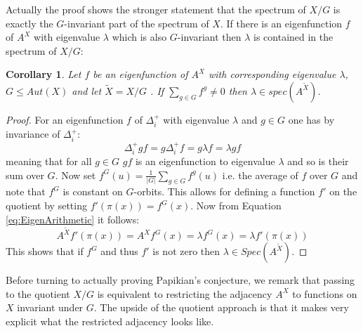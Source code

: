 \documentclass[11pt]{amsart}
\newtheorem{corollary}[theorem]{Corollary}
\begin{document}
	Actually the proof shows the stronger statement that the spectrum of $X/G$ is exactly the $G$-invariant part of the spectrum of $X$. If there is an eigenfunction $f$ of $A^X$ with eigenvalue $\lambda$ which is also $G$-invariant then $\lambda$ is contained in the spectrum of $X/G$:
	\begin{corollary}
		Let $f$ be an eigenfunction of $A^X$ with corresponding eigenvalue $\lambda$, $G\leq Aut(X)$ and let $\tilde{X}=X/G$ . If $\sum_{g\in G} f^g\neq 0$ then $\lambda\in spec(A^{\tilde{X}})$.
		\label{cor:PreciseSpectrum}
	\end{corollary}
	\begin{proof}
		For an eigenfunction $f$ of $\Delta_i^+$  with eigenvalue $\lambda$ and $g\in G$ one has by invariance of $\Delta_i^+$:
        \begin{equation}
            \Delta_i^+gf=g\Delta_i^+f=  g\lambda f=\lambda gf  
        \end{equation}
        meaning that for all $g\in G$ $gf$ is an eigenfunction to eigenvalue $\lambda$ and so is their sum over $G$. Now set $f^G(u)=\frac{1}{|G|}\sum_{g\in G}f^g(u)$ i.e. the average of $f$ over $G$ and note that $f^G$ is constant on $G$-orbits. This allows for defining a function $f'$ on the quotient by setting $f'(\pi(x))=f^G(x)$. Now from Equation \ref{eq:EigenArithmetic} it follows:
		\begin{equation}
			A^{\tilde{X}}f'(\pi(x))=A^Xf^G(x)=\lambda f^G(x)=\lambda f'(\pi(x))
		\end{equation}
		This shows that if $f^G$ and thus $f'$ is not zero then $\lambda\in Spec(A^{\tilde{X}})$.
	\end{proof}
    Before turning to actually proving Papikian's conjecture, we remark that passing to the quotient $X/G$ is equivalent to restricting the adjacency $A^X$ to functions on $X$ invariant under $G$. The upside of the quotient approach is that it makes very explicit what the restricted adjacency looks like. 
\end{document}
